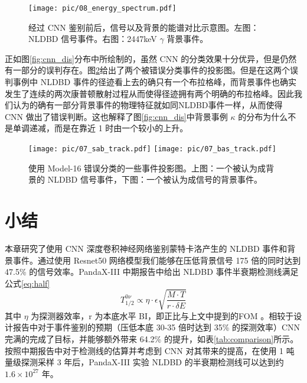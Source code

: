 \begin{figure}
    \centering
    \texttt{[image: pic/08\_energy\_spectrum.pdf]}
    \caption{经过 CNN 鉴别前后，信号以及背景的能谱对比示意图。左图：NLDBD 信号事件。右图：2447keV $\gamma$ 背景事件。}
    \label{fig:cnn_specturm}
\end{figure}

正如图\ref{fig:cnn_dis}分布中所绘制的，虽然 CNN 的分类效果十分优异，但是仍然有一部分的误判存在。图\ref{fig:wrong_judge}给出了两个被错误分类事件的投影图。但是在这两个误判事例中 NLDBD 事件的径迹看上去的确只有一个布拉格峰，而背景事件也确实发生了连续的两次康普顿散射过程从而使得径迹拥有两个明确的布拉格峰。因此我们认为的确有一部分背景事件的物理特征就如同NLDBD事件一样，从而使得 CNN 做出了错误判断。这也解释了图\ref{fig:cnn_dis}中背景事例 $\kappa$ 的分布为什么不是单调递减，而是在靠近 1 时由一个较小的上升。

\begin{figure}
    \centering
    \texttt{[image: pic/07\_sab\_track.pdf]}
    \texttt{[image: pic/07\_bas\_track.pdf]}
    \caption{使用 Model-16 错误分类的一些事件投影图。上图：一个被认为成背景的 NLDBD 信号事件，下图：一个被认为成信号的背景事件。}
    \label{fig:wrong_judge}
\end{figure}

\section{小结}

本章研究了使用 CNN 深度卷积神经网络鉴别蒙特卡洛产生的 NLDBD 事件和背景事件。通过使用 Resnet50 网络模型我们能够在压低背景信号 175 倍的同时达到 47.5\% 的信号效率。PandaX-III 中期报告中给出 NLDBD 事件半衰期检测线满足公式\ref{eq:half}\supercite{cdr}
\begin{equation}
    T_{1/2}^{0\nu}\propto\eta\cdot\epsilon\sqrt{\frac{M\cdot T}{r\cdot\delta E}}
    \label{eq:half}
\end{equation}
其中 $\eta$ 为探测器效率，r 为本底水平 BI，即正比与上文中提到的FOM 。相较于设计报告中对于事件鉴别的预期（压低本底 30-35 倍时达到 35\% 的探测效率）CNN 完满的完成了目标，并能够额外带来 64.2\% 的提升，如表\ref{tab:comparison}所示。按照中期报告中对于检测线的估算并考虑到 CNN 对其带来的提高，在使用 1 吨量级探测采样 3 年后，PandaX-III 实验 \xeots NLDBD 的半衰期检测线可以达到约 $1.6\times10^{27}$ 年。

